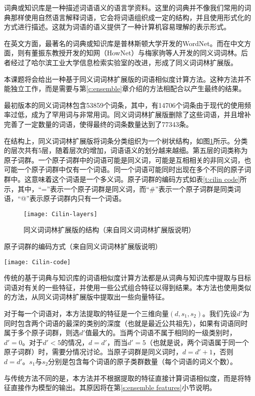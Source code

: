 
\label{c:dict lib}
词典或知识库是一种描述词语语义的语言学资料。这里的词典并不像我们常用的词典那样使用自然语言解释词语，它会将词语组织成一定的结构，并且使用形式化的方式进行描述。这就为词语的语义提供了一种计算机容易理解的表示形式。

在英文方面，最著名的词典或知识库是普林斯顿大学开发的WordNet。而在中文方面，则有董振东教授开发的知网（HowNet）与梅家驹等人开发的同义词词林。后者经过了哈尔滨工业大学信息检索实验室的改进，形成了同义词词林扩展版。

本课题将会给出一种基于同义词词林扩展版的词语相似度计算方法。这种方法并不能独立工作，而是需要与第\ref{c:ensemble}章介绍的方法相配合以产生最终的结果。

最初版本的同义词词林包含53859个词条，其中，有14706个词条由于现代的使用频率过低，成为了罕用词与非常用词。同义词词林扩展版删除了这些词语，并且增补完善了一定数量的词语，使得最终的词条数量达到了77343条。

在结构上，同义词词林扩展版将词条分类组织为一个树状结构，如图\ref{f:cilin layers}所示。分类的层次共有5层，随着层次的增加，词语语义的划分越来越细。第五层的词类称为原子词群。一个原子词群中的词语可能是同义词，可能是互相相关的非同义词，也可能一个原子词群中仅有一个词语。同一个词语可能同时出现在多个不同的原子词群中。这意味着这个词语是一个多义词。原子词群的编码方式如表\ref{t:cilin code}所示，其中，“=”表示一个原子词群是同义词，而“\#”表示一个原子词群是同类词语，“@”表示原子词群内只有一个词语。

\begin{figure}[h]
	\centering
	\texttt{[image: Cilin-layers]}
	\caption{同义词词林扩展版的结构（来自同义词词林扩展版说明）}
	\label{f:cilin layers}
	\vspace{-1em}
\end{figure}

\begin{table}[h]
	\caption{原子词群的编码方式（来自同义词词林扩展版说明）}
	\label{t:cilin code}
	\vspace{0.5em}
	\centering
	\texttt{[image: Cilin-code]}
\end{table}

\label{s:dict features}
传统的基于词典与知识库的词语相似度计算方法都是从词典与知识库中提取与目标词语对有关的一些特征，并使用一些公式组合特征以得到结果。本方法也使用类似的方法，从同义词词林扩展版中提取出一些向量特征。

对于每一个词语对，本方法提取的特征是一个三维向量$(d, s_1, s_2)$。我们先设$d'$为同时包含两个词语的最深的类别的深度（也就是最近公共祖先），如果有词语同时属于多个原子词群，则选$d'$值最大的。当两个词语不属于相同的一级类别时，$d' = 0$。对于$d' < 5$的情况，$d = d'$，而当$d' = 5$（也就是说，两个词语属于同一个原子词群）时，需要分情况讨论。当原子词群是同义词时，$d = d' + 1$，否则$d = d'$。$s_1$与$s_2$分别是包含每个词语的原子类群数量（每个词语的词义个数）。

与传统方法不同的是，本方法并不根据提取的特征直接计算词语相似度，而是将特征直接作为模型的输出。其原因将在第\ref{s:ensemble features}小节说明。